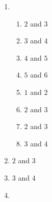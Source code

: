 {\begin{multicols}{3}
\begin{enumerate}[noitemsep, label=\textbf{\arabic*}. ]
\item %

    \begin{enumerate}[noitemsep, label=\textbf{(\alph*)} ] 
\item $2$ and $3$
\item $3$ and $4$
\item $4$ and $5$
\item $5$ and $6$
\item $1$ and $2$
\item $2$ and $3$
\item $2$ and $3$
\item $3$ and $4$
    \end{enumerate}


\item $2$ and $3$%
\item $3$ and $4$%

\item %


\end{enumerate}
\end{multicols}}
